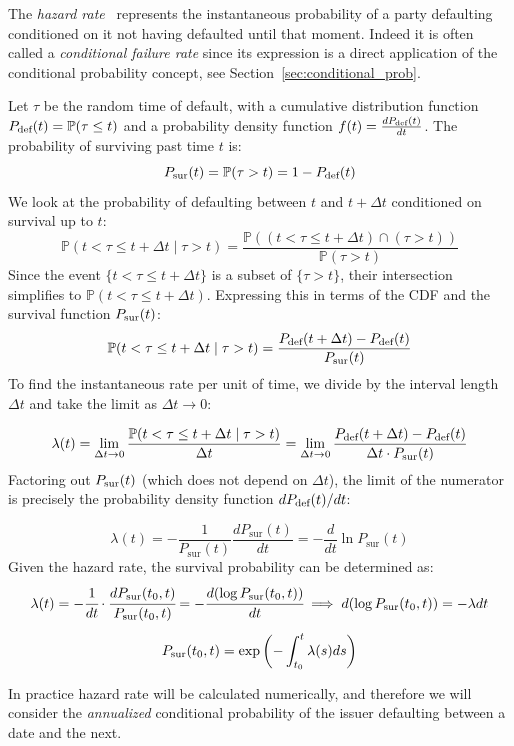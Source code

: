 The \emph{hazard rate}~\cite{bib:hazard} represents the instantaneous probability of a party defaulting conditioned on it not having defaulted until that moment. Indeed it is often called a \emph{conditional failure rate} since its expression is a direct application of the conditional probability concept, see Section~\ref{sec:conditional_prob}.

Let $\tau$ be the random time of default, with a cumulative distribution function $P_{\text{def}}(t) = \mathbb{P}(\tau \le t)$ and a probability density function $f(t) = \frac{dP_{\text{def}}(t)}{dt}$.
The probability of surviving past time $t$ is:
$$P_{\text{sur}}(t) = \mathbb{P}(\tau > t) = 1 - P_{\text{def}}(t)$$
We look at the probability of defaulting between $t$ and $t + \Delta t$ conditioned on survival up to $t$:
$$\mathbb{P}(t < \tau \le t + \Delta t \mid \tau > t) = \frac{\mathbb{P}((t < \tau \le t + \Delta t) \cap (\tau > t))}{\mathbb{P}(\tau > t)}$$
Since the event $\{t < \tau \le t + \Delta t\}$ is a subset of $\{\tau > t\}$, their intersection simplifies to $\mathbb{P}(t < \tau \le t + \Delta t)$. Expressing this in terms of the CDF and the survival function $P_{\text{sur}}(t)$:
$$\mathbb{P}(t < \tau \le t + \Delta t \mid \tau > t) = \frac{P_{\text{def}}(t + \Delta t) - P_{\text{def}}(t)}{P_{\text{sur}}(t)}$$
To find the instantaneous rate per unit of time, we divide by the interval length $\Delta t$ and take the limit as $\Delta t \to 0$:

$$\lambda(t) = \lim_{\Delta t \to 0} \frac{\mathbb{P}(t < \tau \le t + \Delta t \mid \tau > t)}{\Delta t} = \lim_{\Delta t \to 0} \frac{P_{\text{def}}(t + \Delta t) - P_{\text{def}}(t)}{\Delta t \cdot P_{\text{sur}}(t)}$$
Factoring out $P_{\text{sur}}(t)$ (which does not depend on $\Delta t$), the limit of the numerator is precisely the probability density function $dP_{\text{def}}(t)/dt$:

$$\lambda(t) = -\frac{1}{P_{\text{sur}}(t)} \frac{dP_{\text{sur}}(t)}{dt} = -\frac{d}{dt} \ln P_{\text{sur}}(t)$$
Given the hazard rate, the survival probability can be determined as:
\begin{equation}
\begin{gathered}
\lambda(t) = -\cfrac{1}{dt}\cdot\cfrac{dP_{\text{sur}}(t_0, t)}{P_{\text{sur}}(t_0, t)} = -\cfrac{d(\log P_{\text{sur}}(t_0, t))}{dt} \implies d(\log P_{\text{sur}}(t_0, t)) = -\lambda dt\\[5pt]
P_{\text{sur}}(t_0, t) = \mathrm{exp}\left(-\int_{t_0}^{t}\lambda(s) ds\right)
\end{gathered}
\label{eq:constant_hazard_rate_prob}
\end{equation}

In practice hazard rate will be calculated numerically, and therefore we will consider the \emph{annualized} conditional probability of the issuer defaulting between a date and the next.

